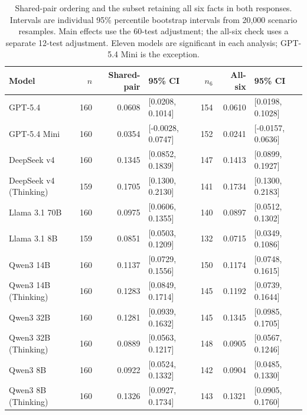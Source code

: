 \begin{table}[t]
\centering
\scriptsize
\setlength{\tabcolsep}{3pt}
\begin{tabular}{lrrlrrl}
\toprule
Model & $n$ & Shared-pair & 95\% CI & $n_6$ & All-six & 95\% CI \\
\midrule
GPT-5.4 & 160 & 0.0608 & [0.0208, 0.1014] & 154 & 0.0610 & [0.0198, 0.1028] \\
GPT-5.4 Mini & 160 & 0.0354 & [-0.0028, 0.0747] & 152 & 0.0241 & [-0.0157, 0.0636] \\
DeepSeek v4 & 160 & 0.1345 & [0.0852, 0.1839] & 147 & 0.1413 & [0.0899, 0.1927] \\
DeepSeek v4 (Thinking) & 159 & 0.1705 & [0.1300, 0.2130] & 141 & 0.1734 & [0.1300, 0.2183] \\
Llama 3.1 70B & 160 & 0.0975 & [0.0606, 0.1355] & 140 & 0.0897 & [0.0512, 0.1302] \\
Llama 3.1 8B & 159 & 0.0851 & [0.0503, 0.1209] & 132 & 0.0715 & [0.0349, 0.1086] \\
Qwen3 14B & 160 & 0.1137 & [0.0729, 0.1556] & 150 & 0.1174 & [0.0748, 0.1615] \\
Qwen3 14B (Thinking) & 160 & 0.1283 & [0.0849, 0.1714] & 145 & 0.1192 & [0.0739, 0.1644] \\
Qwen3 32B & 160 & 0.1281 & [0.0939, 0.1632] & 145 & 0.1345 & [0.0985, 0.1705] \\
Qwen3 32B (Thinking) & 160 & 0.0889 & [0.0563, 0.1217] & 148 & 0.0905 & [0.0567, 0.1246] \\
Qwen3 8B & 160 & 0.0922 & [0.0524, 0.1332] & 142 & 0.0904 & [0.0485, 0.1330] \\
Qwen3 8B (Thinking) & 160 & 0.1326 & [0.0927, 0.1734] & 143 & 0.1321 & [0.0905, 0.1760] \\
\bottomrule
\end{tabular}
\caption{Shared-pair ordering and the subset retaining all six facts in both responses. Intervals are individual 95\% percentile bootstrap intervals from 20,000 scenario resamples. Main effects use the 60-test adjustment; the all-six check uses a separate 12-test adjustment. Eleven models are significant in each analysis; GPT-5.4 Mini is the exception.}
\label{tab:ordering_robustness}
\end{table}
